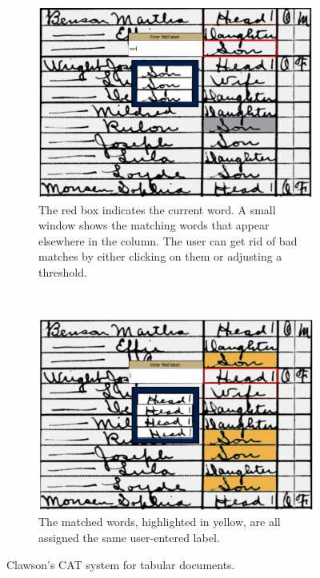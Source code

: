 \documentclass[ms,electronic,twosidetoc,letterpaper,chaptercenter,parttop,lof,lot]{byumsphd}
\begin{document}
\begin{figure}
    \centering
    \begin{subfigure}[t]{0.46\textwidth}
    		\centering
    		\includegraphics[width=\textwidth]{ii_ex_a}
    		\caption{The red box indicates the current word. A small window shows the matching words that appear elsewhere in the column. The user can get rid of bad matches by either clicking on them or adjusting a  threshold.}
    	\end{subfigure}
    	~
    	\begin{subfigure}[t]{0.46\textwidth}
    		\centering
    		\includegraphics[width=\textwidth]{ii_ex_b}
    		\caption{The matched words,  highlighted in yellow, are all assigned the same user-entered label.}
    	\end{subfigure}
    	\caption{Clawson's CAT system for tabular documents.}
    	\label{fig:ii}
\end{figure}
\end{document}
